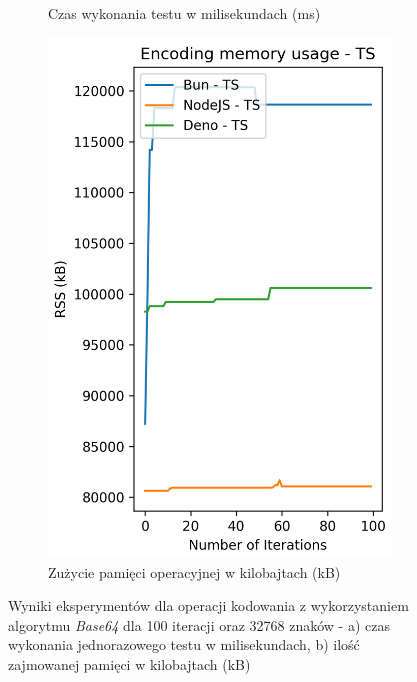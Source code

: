 \begin{figure}[H]
\begin{subfigure}[b]{0.42\textwidth}
    \caption{Czas wykonania testu w milisekundach (ms)}
    \label{fig:encoding_e1_ts_time}
  \end{subfigure}
  \begin{subfigure}[b]{0.42\textwidth}
    \centering
    \includegraphics[width=\textwidth]{Figures/coding/base64_100_encoding_ts_memory.png}
    \caption{Zużycie pamięci operacyjnej w kilobajtach (kB)}
    \label{fig:encoding_e1_ts_memory}
  \end{subfigure}
  \hfill
  \caption{Wyniki eksperymentów dla operacji kodowania z wykorzystaniem algorytmu \textit{Base64} dla 100 iteracji oraz 32768 znaków - a) czas wykonania jednorazowego testu w milisekundach, b) ilość zajmowanej pamięci w kilobajtach (kB)}
  \label{fig:encoding_e1_ts}
\end{figure}

